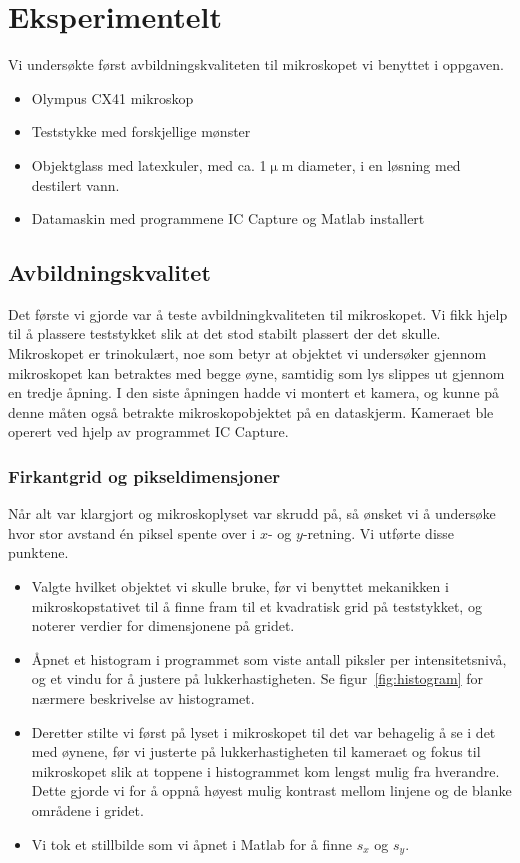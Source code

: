 \documentclass[a4paper,11pt, twocolumn]{article}
\begin{document}
\section{Eksperimentelt}
Vi undersøkte først avbildningskvaliteten til mikroskopet vi benyttet i oppgaven. 
\begin{itemize}
	\item Olympus CX41 mikroskop
	\item Teststykke med forskjellige mønster
	\item Objektglass med latexkuler, med ca. 1$\upmu$m diameter, i en løsning med destilert vann.
	\item Datamaskin med programmene IC Capture og Matlab installert
\end{itemize}

\subsection{Avbildningskvalitet}
Det første vi gjorde var å teste avbildningkvaliteten til mikroskopet. Vi fikk hjelp til å plassere teststykket slik at det stod stabilt plassert der det skulle. Mikroskopet er trinokulært, noe som betyr at objektet vi undersøker gjennom mikroskopet kan betraktes med begge øyne, samtidig som lys slippes ut gjennom en tredje åpning. I den siste åpningen hadde vi montert et kamera, og kunne på denne måten også betrakte mikroskopobjektet på en dataskjerm. Kameraet ble operert ved hjelp av programmet IC Capture.


\subsubsection{Firkantgrid og pikseldimensjoner}
Når alt var klargjort og mikroskoplyset var skrudd på, så ønsket vi å undersøke hvor stor avstand \'en piksel spente over i $x$- og $y$-retning. Vi utførte disse punktene.

\begin{itemize}
	\item Valgte hvilket objektet vi skulle bruke, før vi benyttet mekanikken i mikroskopstativet til å finne fram til et kvadratisk grid på teststykket, og noterer verdier for dimensjonene på gridet.
	\item Åpnet et histogram i programmet som viste antall piksler per intensitetsnivå, og et vindu for å justere på lukkerhastigheten. Se figur~\ref{fig:histogram} for nærmere beskrivelse av histogramet.
	\item Deretter stilte vi først på lyset i mikroskopet til det var behagelig å se i det med øynene, før vi justerte på lukkerhastigheten til kameraet og fokus til mikroskopet slik at toppene i histogrammet kom lengst mulig fra hverandre. Dette gjorde vi for å oppnå høyest mulig kontrast mellom linjene og de blanke områdene i gridet.
	\item Vi tok et stillbilde som vi åpnet i Matlab for å finne $s_x$ og $s_y$. 
\end{itemize}
\end{document}
